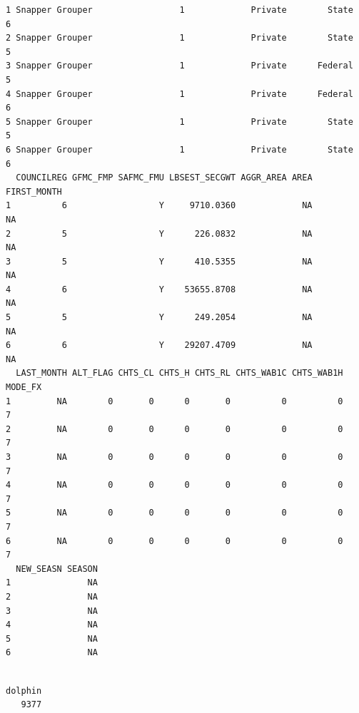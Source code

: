 \documentclass[
  letterpaper,
  oneside,
  open=any]{scrbook}
\newenvironment{Shaded}{\begin{snugshade}}{\end{snugshade}}
\newcommand{\CommentTok}[1]{\textcolor[rgb]{0.37,0.37,0.37}{#1}}
\newcommand{\FunctionTok}[1]{\textcolor[rgb]{0.28,0.35,0.67}{#1}}
\newcommand{\NormalTok}[1]{\textcolor[rgb]{0.00,0.23,0.31}{#1}}
\newcommand{\SpecialCharTok}[1]{\textcolor[rgb]{0.37,0.37,0.37}{#1}}
\newcommand{\StringTok}[1]{\textcolor[rgb]{0.13,0.47,0.30}{#1}}
\begin{document}
\begin{verbatim}
1 Snapper Grouper                 1             Private        State      6
2 Snapper Grouper                 1             Private        State      5
3 Snapper Grouper                 1             Private      Federal      5
4 Snapper Grouper                 1             Private      Federal      6
5 Snapper Grouper                 1             Private        State      5
6 Snapper Grouper                 1             Private        State      6
  COUNCILREG GFMC_FMP SAFMC_FMU LBSEST_SECGWT AGGR_AREA AREA FIRST_MONTH
1          6                  Y     9710.0360             NA          NA
2          5                  Y      226.0832             NA          NA
3          5                  Y      410.5355             NA          NA
4          6                  Y    53655.8708             NA          NA
5          5                  Y      249.2054             NA          NA
6          6                  Y    29207.4709             NA          NA
  LAST_MONTH ALT_FLAG CHTS_CL CHTS_H CHTS_RL CHTS_WAB1C CHTS_WAB1H MODE_FX
1         NA        0       0      0       0          0          0       7
2         NA        0       0      0       0          0          0       7
3         NA        0       0      0       0          0          0       7
4         NA        0       0      0       0          0          0       7
5         NA        0       0      0       0          0          0       7
6         NA        0       0      0       0          0          0       7
  NEW_SEASN SEASON
1               NA
2               NA
3               NA
4               NA
5               NA
6               NA
\end{verbatim}

\begin{Shaded}
\end{Shaded}

\begin{verbatim}

dolphin 
   9377 
\end{verbatim}
\end{document}
